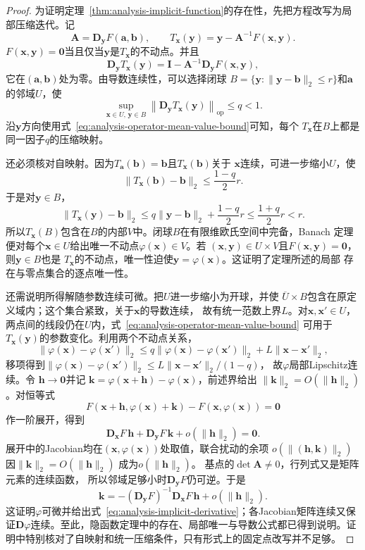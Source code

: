 \begin{proof}
为证明定理~\ref{thm:analysis-implicit-function}的存在性，先把方程改写为局部压缩迭代。记
\[   \bm{A}   =   \bm{D}_{\bm{y}}F(\bm{a},\bm{b}),   \qquad   T_{\bm{x}}(\bm{y})   =   \bm{y}-\bm{A}^{-1}F(\bm{x},\bm{y}). \]
$F(\bm{x},\bm{y})=\bm{0}$当且仅当$\bm{y}$是$T_{\bm{x}}$的不动点。并且
\[   \bm{D}_{\bm{y}}T_{\bm{x}}(\bm{y})   =   \bm{I}   -   \bm{A}^{-1}\bm{D}_{\bm{y}}F(\bm{x},\bm{y}), \]
它在$(\bm{a},\bm{b})$处为零。由导数连续性，可以选择闭球 $B=\{\bm{y}:\lVert\bm{y}-\bm{b}\rVert_2\leq r\}$和$\bm{a}$的邻域$U$，使
\begin{equation}
  \sup_{\bm{x}\in U,\,\bm{y}\in B}
  \left\lVert
    \bm{D}_{\bm{y}}T_{\bm{x}}(\bm{y})
  \right\rVert_{\mathrm{op}}
  \leq q<1.
\label{eq:analysis-ift-uniform-contraction}
\end{equation}
沿$\bm{y}$方向使用式~\eqref{eq:analysis-operator-mean-value-bound}可知，每个
$T_{\bm{x}}$在$B$上都是同一因子$q$的压缩映射。

还必须核对自映射。因为$T_{\bm{a}}(\bm{b})=\bm{b}$且$T_{\bm{x}}(\bm{b})$关于 $\bm{x}$连续，可进一步缩小$U$，使
\[   \lVert T_{\bm{x}}(\bm{b})-\bm{b}\rVert_2   \leq\frac{1-q}{2}r. \]
于是对$\bm{y}\in B$，
\[
  \lVert T_{\bm{x}}(\bm{y})-\bm{b}\rVert_2
  \leq
  q\lVert\bm{y}-\bm{b}\rVert_2+\frac{1-q}{2}r
  \leq
  \frac{1+q}{2}r
  <r.
\]
所以$T_{\bm{x}}(B)$包含在$B$的内部$V$中。闭球$B$在有限维欧氏空间中完备，Banach
定理便对每个$\bm{x}\in U$给出唯一不动点$\varphi(\bm{x})\in V$。若
$(\bm{x},\bm{y})\in U\times V$且$F(\bm{x},\bm{y})=\bm{0}$，则$\bm{y}\in B$也是
$T_{\bm{x}}$的不动点，唯一性迫使$\bm{y}=\varphi(\bm{x})$。这证明了定理所述的局部
存在与零点集合的逐点唯一性。

还需说明所得解随参数连续可微。把$U$进一步缩小为开球，并使
$\overline U\times B$包含在原定义域内；这个集合紧致，关于$\bm x$的导数连续，
故有统一范数上界$L$。对$\bm x,\bm x'\in U$，
两点间的线段仍在$U$内，式~\eqref{eq:analysis-operator-mean-value-bound}
可用于$T_{\bm x}(\bm y)$的参数变化。利用两个不动点关系，
\[   \lVert\varphi(\bm{x})-\varphi(\bm{x}')\rVert_2   \leq   q\lVert\varphi(\bm{x})-\varphi(\bm{x}')\rVert_2   +L\lVert\bm{x}-\bm{x}'\rVert_2, \]
移项得到$\lVert\varphi(\bm x)-\varphi(\bm x')\rVert_2
\leq L\lVert\bm x-\bm x'\rVert_2/(1-q)$，
故$\varphi$局部Lipschitz连续。令 $\bm{h}\to\bm{0}$并记 $\bm{k}=\varphi(\bm{x}+\bm{h})-\varphi(\bm{x})$，前述界给出 $\lVert\bm{k}\rVert_2=O(\lVert\bm{h}\rVert_2)$。对恒等式
\[   F(\bm{x}+\bm{h},\varphi(\bm{x})+\bm{k})   -   F(\bm{x},\varphi(\bm{x}))   =   \bm{0} \]
作一阶展开，得到
\[   \bm{D}_{\bm{x}}F\,\bm{h}   +   \bm{D}_{\bm{y}}F\,\bm{k}   +   o(\lVert\bm{h}\rVert_2)   =   \bm{0}. \]
展开中的Jacobian均在$(\bm x,\varphi(\bm x))$处取值，联合扰动的余项
$o(\lVert(\bm h,\bm k)\rVert_2)$因$\lVert\bm k\rVert_2=O(\lVert\bm h\rVert_2)$
成为$o(\lVert\bm h\rVert_2)$。
基点的$\det\bm A\neq0$，行列式又是矩阵元素的连续函数，
所以邻域足够小时$\bm D_{\bm y}F$仍可逆。于是
\[   \bm{k}   =   -   (\bm{D}_{\bm{y}}F)^{-1}   \bm{D}_{\bm{x}}F\,\bm{h}   +   o(\lVert\bm{h}\rVert_2). \]
这证明$\varphi$可微并给出式~\eqref{eq:analysis-implicit-derivative}；各Jacobian矩阵连续又保证$\bm{D}\varphi$连续。至此，隐函数定理中的存在、局部唯一与导数公式都已得到说明。证明中特别核对了自映射和统一压缩条件，只有形式上的固定点改写并不足够。
\end{proof}

